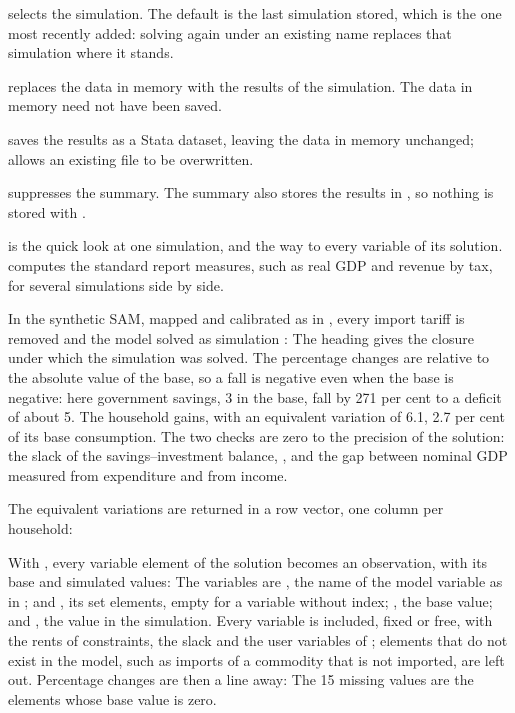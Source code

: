 \begin{optdesc}
\item[\optarg{}{sim}{name}] selects the simulation. The default is the last
simulation stored, which is the one most recently added: solving again under
an existing name replaces that simulation where it stands.

\item[\opt{}{clear}] replaces the data in memory with the results of the
simulation. The data in memory need not have been saved.

\item[\optarg{sav}{ing}{filename\textup{[\texttt{, replace}]}}] saves
the results as a Stata dataset, leaving the data in memory unchanged;
 allows an existing file to be overwritten.

\item[\opt{nod}{isplay}] suppresses the summary. The summary also stores the
results in , so nothing is stored with .
\end{optdesc}


 is the quick look at one simulation, and the way to every
variable of its solution.  computes the standard report
measures, such as real GDP and revenue by tax, for several simulations side by
side.


In the synthetic SAM, mapped and calibrated as in , every
import tariff is removed and the model solved as simulation :
The heading gives the closure under which the simulation was solved. The
percentage changes are relative to the absolute value of the base, so a fall is
negative even when the base is negative: here government savings, 3 in the
base, fall by 271 per cent to a deficit of about 5. The household gains, with
an equivalent variation of 6.1, 2.7 per cent of its base consumption. The two
checks are zero to the precision of the solution: the slack of the
savings--investment balance, , and the gap between nominal GDP
measured from expenditure and from income.

The equivalent variations are returned in a row vector, one column per
household:


With , every variable element of the solution becomes an
observation, with its base and simulated values:
The variables are , the name of the model variable as in
;  and , its set elements,
empty for a variable without index; , the base value; and
, the value in the simulation. Every variable is included, fixed or
free, with the rents of constraints, the slack  and the user
variables of ; elements that do not exist in the model,
such as imports of a commodity that is not imported, are left out. Percentage
changes are then a line away:
The 15 missing values are the elements whose base value is zero.

